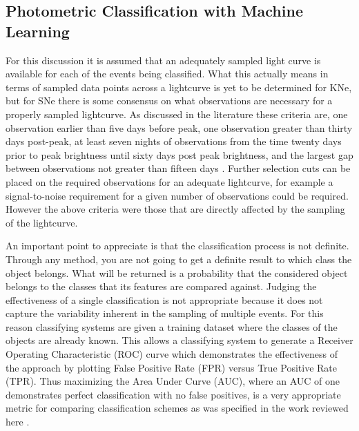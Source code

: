 \documentclass[12pt]{article}
\begin{document}
\subsection{Photometric Classification with Machine Learning} %
For this discussion it is assumed that an adequately sampled light curve is available for each of the events being classified. What this actually means in terms of sampled data points across a lightcurve is yet to be determined for KNe, but for SNe there is some consensus on what observations are necessary for a properly sampled lightcurve. As discussed in the literature these criteria are, one observation earlier than five days before peak, one observation greater than thirty days post-peak, at least seven nights of observations from the time twenty days prior to peak brightness until sixty days post peak brightness, and the largest gap between observations not greater than fifteen days \citep{LSSTScienceCollaboration2017}. Further selection cuts can be placed on the required observations for an adequate lightcurve, for example a signal-to-noise requirement for a given number of observations could be required. However the above criteria were those that are directly affected by the sampling of the lightcurve.\par
An important point to appreciate is that the classification process is not definite. Through any method, you are not going to get a definite result to which class the object belongs. What will be returned is a probability that the considered object belongs to the classes that its features are compared against. Judging the effectiveness of a single classification is not appropriate because it does not capture the variability inherent in the sampling of multiple events. For this reason classifying systems are given a training dataset where the classes of the objects are already known. This allows a classifying system to generate a Receiver Operating Characteristic (ROC) curve which demonstrates the effectiveness of the approach by plotting False Positive Rate (FPR) versus True Positive Rate (TPR). Thus maximizing the Area Under Curve (AUC), where an AUC of one demonstrates perfect classification with no false positives, is a very appropriate metric for comparing classification schemes as was specified in the work reviewed here \citep{Lochner2016}.\par
\end{document}
